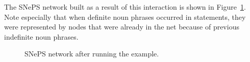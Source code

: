 \documentclass{book}
\begin{document}
The SNePS network built as a result of this interaction is shown in
Figure~\ref{gatnfig2}.  Note especially that when definite noun
phrases occurred in statements, they were represented by nodes that
were already in the net because of previous indefinite noun phrases.
\begin{figure}[tbp]
\vspace{1in}
\caption{SNePS network after running the example.}\label{gatnfig2}
\end{figure}
\end{document}
